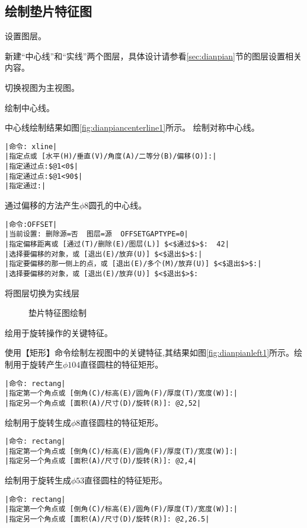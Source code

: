 \subsection{绘制垫片特征图}
\begin{procedure}
\item 设置图层。

新建“中心线”和“实线”两个图层，具体设计请参看\ref{sec:dianpian}节的图层设置相关内容。
\item  切换视图为主视图。
\item 绘制中心线。

中心线绘制结果如图\ref{fig:dianpiancenterline1}所示。
绘制对称中心线。
\begin{lstlisting}
|命令: xline|
|指定点或 [水平(H)/垂直(V)/角度(A)/二等分(B)/偏移(O)]:|
|指定通过点:$@1<0$|
|指定通过点:$@1<90$|
|指定通过:|
\end{lstlisting}
通过偏移的方法产生$\phi 8$圆孔的中心线。
\begin{lstlisting}
|命令:OFFSET|
|当前设置: 删除源=否  图层=源  OFFSETGAPTYPE=0|
|指定偏移距离或 [通过(T)/删除(E)/图层(L)] $<$通过$>$:  42|
|选择要偏移的对象，或 [退出(E)/放弃(U)] $<$退出$>$:|
|指定要偏移的那一侧上的点，或 [退出(E)/多个(M)/放弃(U)] $<$退出$>$:|
|选择要偏移的对象，或 [退出(E)/放弃(U)] $<$退出$>$:
\end{lstlisting}
\item 将图层切换为实线层
\begin{figure}[htbp]
\centering
{}\hspace{40pt}
\caption{垫片特征图绘制}
\end{figure}
\item 绘用于旋转操作的关键特征。

使用【矩形】命令绘制左视图中的关键特征,其结果如图\ref{fig:dianpianleft1}所示。绘制用于旋转产生$\phi 104$直径圆柱的特征矩形。
\begin{lstlisting}
|命令: rectang|
|指定第一个角点或 [倒角(C)/标高(E)/圆角(F)/厚度(T)/宽度(W)]:|
|指定另一个角点或 [面积(A)/尺寸(D)/旋转(R)]: @2,52|
\end{lstlisting}
绘制用于旋转生成$\phi 8$直径圆柱的特征矩形。
\begin{lstlisting}
|命令: rectang|
|指定第一个角点或 [倒角(C)/标高(E)/圆角(F)/厚度(T)/宽度(W)]:|
|指定另一个角点或 [面积(A)/尺寸(D)/旋转(R)]: @2,4|
\end{lstlisting}
绘制用于旋转生成$\phi 53$直径圆柱的特征矩形。
\begin{lstlisting}
|命令: rectang|
|指定第一个角点或 [倒角(C)/标高(E)/圆角(F)/厚度(T)/宽度(W)]:|
|指定另一个角点或 [面积(A)/尺寸(D)/旋转(R)]: @2,26.5|
\end{lstlisting}
\end{procedure}

\endinput